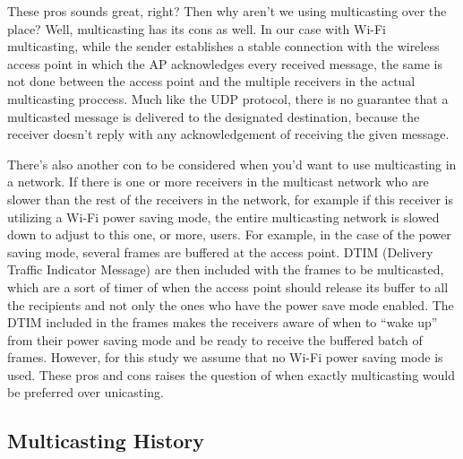 \documentclass[9pt,a4paper]{acmproc}
\begin{document}
	These pros sounds great, right? Then why aren’t we using multicasting over the place? Well, multicasting has its cons as well. In our case with Wi-Fi multicasting, while the sender establishes a stable connection with the wireless access point in which the AP acknowledges every received message, the same is not done between the access point and the multiple receivers in the actual multicasting proccess. Much like the UDP protocol, there is no guarantee that a multicasted message is delivered to the designated destination, because the receiver doesn’t reply with any acknowledgement of receiving the given message. \cite{udpSource}
	
	There’s also another con to be considered when you’d want to use multicasting in a network. If there is one or more receivers in the multicast network who are slower than the rest of the receivers in the network, for example if this receiver is utilizing a Wi-Fi power saving mode, the entire multicasting network is slowed down to adjust to this one, or more, users. For example, in the case of the power saving mode, several frames are buffered at the access point. DTIM (Delivery Traffic Indicator Message) are then included with the frames to be multicasted, which are a sort of timer of when the access point should release its buffer to all the recipients and not only the ones who have the power save mode enabled. The DTIM included in the frames makes the receivers aware of when to “wake up” from their power saving mode and be ready to receive the buffered batch of frames. \cite{impMult} 
However, for this study we assume that no Wi-Fi power saving mode is used. These pros and cons raises the question of when exactly multicasting would be preferred over unicasting.
\newline
\newline



\subsection{Multicasting History}
\end{document}
